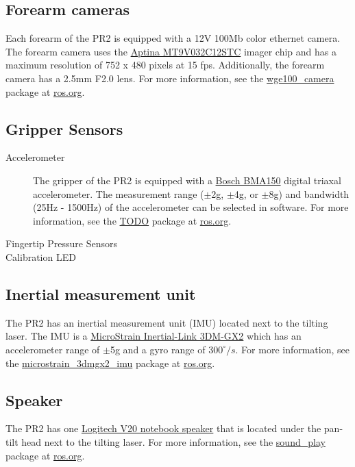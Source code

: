 \subsection{Forearm cameras}
Each forearm of the PR2 is equipped with a 12V 100Mb color ethernet camera. The forearm camera uses the 
\href{http://www.aptina.com/products/image_sensors/mt9v032c12stc/#overview}{Aptina MT9V032C12STC}  imager chip
and has a maximum resolution of 752 x 480 pixels at 15 fps. Additionally, the forearm camera has a 2.5mm F2.0 lens.  
For more information, see the \href{http://www.ros.org/wiki/wge100_camera}{wge100\_camera} package
at \href{http://www.ros.org}{ros.org}.

\subsection{Gripper Sensors}
\begin{description}

\item[Accelerometer]
The gripper of the PR2 is equipped with a \href{http://www.bosch-sensortec.com/content/language1/html/3474.htm}{Bosch BMA150} 
digital triaxal accelerometer. The measurement range ($\pm$2g, $\pm$4g, or $\pm$8g) and bandwidth (25Hz - 1500Hz) 
of the accelerometer can be selected in software. For more information, see the \href{http://www.ros.org/wiki/wge100_camera}{TODO} 
package at \href{http://www.ros.org}{ros.org}.

\item[Fingertip Pressure Sensors]


\item[Calibration LED]

\end{description}

\subsection{Inertial measurement unit}
The PR2 has an inertial measurement unit (IMU) located next to the tilting laser. The IMU is a 
\href{http://www.microstrain.com/3dm-gx2.aspx}{MicroStrain Inertial-Link 3DM-GX2} which has an 
accelerometer range of $\pm$5g and a gyro range of $300^\circ/s$. For more information, see 
the \href{http://www.ros.org/wiki/microstrain_3dmgx2_imu}{microstrain\_3dmgx2\_imu} package at \href{http://www.ros.org}{ros.org}.

\subsection{Speaker}
The PR2 has one \href{http://www.logitech.com/index.cfm/speakers_audio/home_pc_speakers/devices/199&cl=us,en}{Logitech V20 notebook speaker} 
that is located under the pan-tilt head next to the tilting laser. For more information, 
see the \href{http://www.ros.org/wiki/sound_play}{sound\_play} package at \href{http://www.ros.org}{ros.org}.

